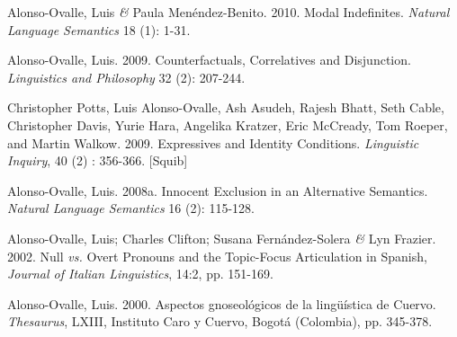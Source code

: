 \documentclass[11pt]{article}
\begin{document}
Alonso-Ovalle, Luis \textit{\&} Paula
    Men\'endez-Benito. 2010. Modal Indefinites. \textit{Natural
      Language Semantics} 18 (1): 1-31. 

Alonso-Ovalle, Luis. 2009. Counterfactuals,
  Correlatives and Disjunction. \textit{Linguistics and Philosophy} 32 (2): 207-244.


Christopher Potts, Luis Alonso-Ovalle, Ash Asudeh,
    Rajesh Bhatt, Seth Cable, Christopher Davis, Yurie Hara, Angelika
    Kratzer, Eric McCready, Tom Roeper, and Martin Walkow. 2009. 
  Expressives and Identity Conditions. \textit{Linguistic Inquiry}, 40
  (2) : 356-366. [Squib]

Alonso-Ovalle, Luis. 2008a. Innocent Exclusion in an
  Alternative Semantics. \textit{Natural Language Semantics} 16 (2):
  115-128. 


Alonso-Ovalle, Luis; Charles Clifton; Susana Fern\'andez-Solera \textit{\&} Lyn Frazier. 2002. Null \textit{vs.} Overt Pronouns and the Topic-Focus Articulation in Spanish, \textit{Journal of Italian Linguistics}, 14:2, pp. 151-169. 

Alonso-Ovalle, Luis. 2000. Aspectos gnoseol\'ogicos de la ling\"u\'istica de Cuervo. \textit{Thesaurus}, LXIII, Instituto Caro y Cuervo, Bogot\'a (Colombia), pp. 345-378. 
\end{document}
